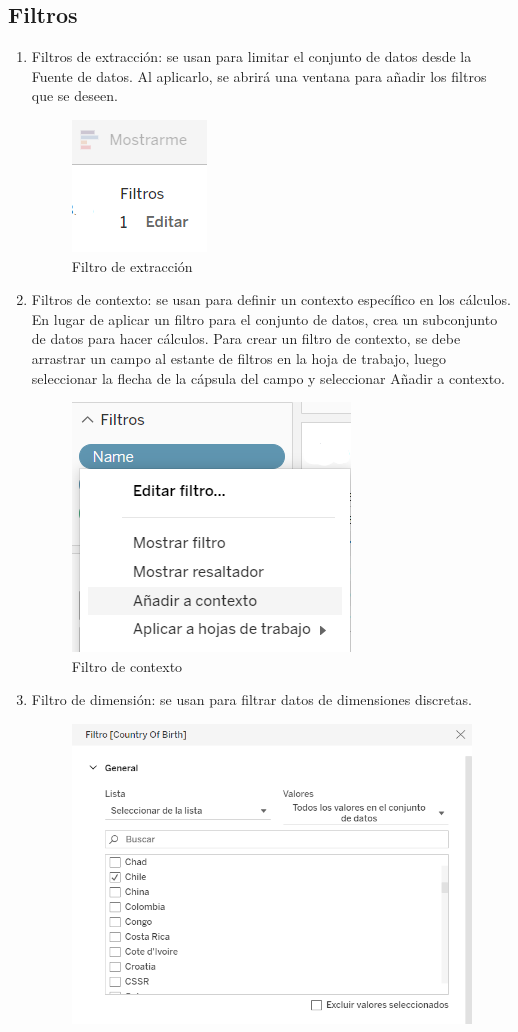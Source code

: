 \documentclass[a4paper, 12pt]{book}
\begin{document}
\subsection{Filtros}
\begin{enumerate}
	\item Filtros de extracción: se usan para limitar el conjunto de datos desde la Fuente de datos. Al aplicarlo, se abrirá una ventana para añadir los filtros que se deseen.
	\begin{figure}[H] 
		\centering 
		\includegraphics[width=0.2\linewidth]{filtro1.png}
		\caption{Filtro de extracción}
	\end{figure}
	\item Filtros de contexto: se usan para definir un contexto específico en los cálculos. En lugar de aplicar un filtro para el conjunto de datos, crea un subconjunto de datos para hacer cálculos. Para crear un filtro de contexto, se debe arrastrar un campo al estante de filtros en la hoja de trabajo, luego seleccionar la flecha de la cápsula del campo y seleccionar Añadir a contexto.
	\begin{figure}[H] 
		\centering 
		\includegraphics[width=0.3\linewidth]{filtro2.png}
		\caption{Filtro de contexto}
	\end{figure}
	\item Filtro de dimensión: se usan para filtrar datos de dimensiones discretas.
	\begin{figure}[H] 
		\centering 
		\includegraphics[width=0.6\linewidth]{filtro3.png}

\end{figure}
\end{enumerate}
\end{document}
